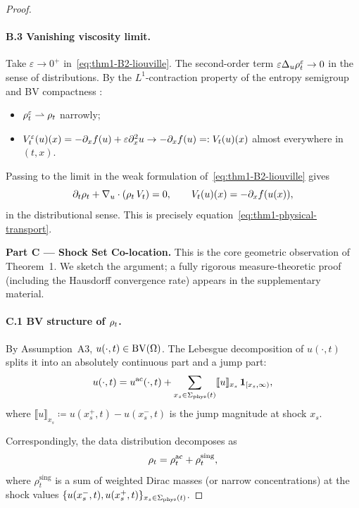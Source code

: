 \begin{proof}
\paragraph{B.3 Vanishing viscosity limit.}
Take $\varepsilon \to 0^{+}$ in~\eqref{eq:thm1-B2-liouville}. The second-order term $\varepsilon \Delta_{u} \rho_{t}^{\varepsilon} \to 0$ in the sense of distributions. By the $L^{1}$-contraction property of the entropy semigroup and BV compactness \citep{helly, kruzhkov1970}:
\begin{itemize}
\item $\rho_{t}^{\varepsilon} \rightharpoonup \rho_{t}$ narrowly;
\item $V_{t}^{\varepsilon}(u)(x) = -\partial_{x} f(u) + \varepsilon \partial_{x}^{2} u \to -\partial_{x} f(u) =: V_{t}(u)(x)$ almost everywhere in $(t,x)$.
\end{itemize}

Passing to the limit in the weak formulation of~\eqref{eq:thm1-B2-liouville} gives
\begin{equation}
\partial_{t} \rho_{t} + \nabla_{u} \cdot (\rho_{t} \, V_{t}) = 0, \qquad
V_{t}(u)(x) = -\partial_{x} f(u(x)),
\label{eq:thm1-B3-limit}
\end{equation}
in the distributional sense. This is precisely equation~\eqref{eq:thm1-physical-transport}.

\medskip
\noindent
\textbf{Part C --- Shock Set Co-location.}
This is the core geometric observation of Theorem~1. We sketch the argument; a fully rigorous measure-theoretic proof (including the Hausdorff convergence rate) appears in the supplementary material.

\paragraph{C.1 BV structure of $\rho_{t}$.}
By Assumption~A3, $u(\cdot, t) \in \mathrm{BV}(\Omega)$. The Lebesgue decomposition of $u(\cdot, t)$ splits it into an absolutely continuous part and a jump part:
\begin{equation}
u(\cdot, t) = u^{\mathrm{ac}}(\cdot, t) + \sum_{x_{s} \in \Sigma_{\mathrm{phys}}(t)} \llbracket u \rrbracket_{x_{s}} \, \mathbf{1}_{[x_{s}, \infty)},
\label{eq:thm1-C1-decomp}
\end{equation}
where $\llbracket u \rrbracket_{x_{s}} \coloneqq u(x_{s}^{+}, t) - u(x_{s}^{-}, t)$ is the jump magnitude at shock $x_{s}$.

Correspondingly, the data distribution decomposes as
\begin{equation}
\rho_{t} = \rho_{t}^{\mathrm{ac}} + \rho_{t}^{\mathrm{sing}},
\label{eq:thm1-C1-rho-decomp}
\end{equation}
where $\rho_{t}^{\mathrm{sing}}$ is a sum of weighted Dirac masses (or narrow concentrations) at the shock values $\{u(x_{s}^{-}, t), u(x_{s}^{+}, t)\}_{x_{s} \in \Sigma_{\mathrm{phys}}(t)}$.


\end{proof}
